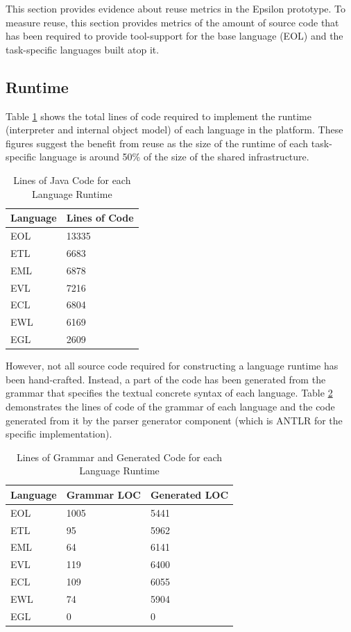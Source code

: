 This section provides evidence about reuse metrics in the Epsilon prototype. To measure reuse, this section provides metrics of the amount of source code that has been required to provide tool-support for the base language (EOL) and the task-specific languages built atop it.

\subsection{Runtime}

Table \ref{tab:LinesOfJavaCodeLanguage} shows the total lines of code required to implement the runtime (interpreter and internal object model) of each language in the platform. These figures suggest the benefit from reuse as the size of the runtime of each task-specific language is around 50\% of the size of the shared infrastructure.

\begin{table}
	\centering
		\begin{tabular}{|l|l|}\hline
		\textbf{Language} & \textbf{Lines of Code} \\\hline
		EOL	& 13335 \\\hline
		ETL	& 6683 \\\hline
		EML	& 6878 \\\hline
		EVL	& 7216 \\\hline
		ECL	& 6804 \\\hline
		EWL	& 6169 \\\hline
		EGL	& 2609 \\\hline
		\end{tabular}		
	\caption{Lines of Java Code for each Language Runtime}
	\label{tab:LinesOfJavaCodeLanguage}
\end{table}

However, not all source code required for constructing a language runtime has been hand-crafted. Instead, a part of the code has been generated from the grammar that specifies the textual concrete syntax of each language. Table \ref{tab:LinesOfGrammarAndGeneratedCode} demonstrates the lines of code of the grammar of each language and the code generated from it by the parser generator component (which is ANTLR \cite{ANTLR} for the specific implementation).

\begin{table}
	\centering
		\begin{tabular}{|l|l|l|}\hline
		\textbf{Language} & \textbf{Grammar LOC} & \textbf{Generated LOC} \\\hline
		EOL	& 1005 &5441\\\hline
		ETL & 95 & 5962\\\hline
		EML & 64 & 6141\\\hline	
		EVL & 119 & 6400\\\hline
		ECL & 109 & 6055\\\hline	
		EWL & 74 & 5904\\\hline	
		EGL & 0 & 0\\\hline	
		\end{tabular}
	\caption{Lines of Grammar and Generated Code for each Language Runtime}
	\label{tab:LinesOfGrammarAndGeneratedCode}
\end{table}

